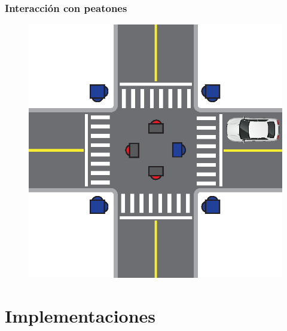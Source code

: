 \begin{frame}
\frametitle{Interacción con peatones}
\begin{figure}[htbp]
	\centering
	\includegraphics[scale=\tamInterseccion]{diagramas/peaton-auto.eps}
\end{figure}
\end{frame}

\section{Implementaciones}

